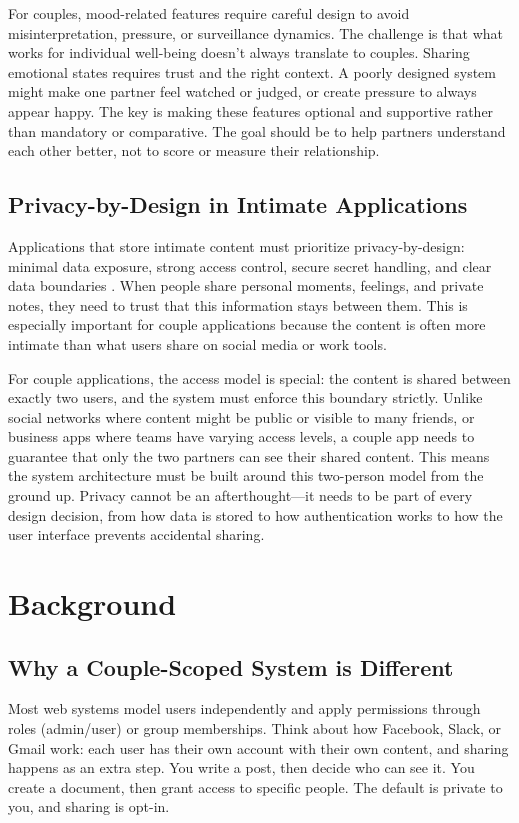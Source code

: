 \documentclass[sigconf, authorversion, nonacm, margin=0.75in]{acmart}
\begin{document}
For couples, mood-related features require careful design to avoid misinterpretation, pressure, or surveillance dynamics. The challenge is that what works for individual well-being doesn't always translate to couples. Sharing emotional states requires trust and the right context. A poorly designed system might make one partner feel watched or judged, or create pressure to always appear happy. The key is making these features optional and supportive rather than mandatory or comparative. The goal should be to help partners understand each other better, not to score or measure their relationship.

\subsection{Privacy-by-Design in Intimate Applications}
Applications that store intimate content must prioritize privacy-by-design: minimal data exposure, strong access control, secure secret handling, and clear data boundaries \cite{privacy_by_design}. When people share personal moments, feelings, and private notes, they need to trust that this information stays between them. This is especially important for couple applications because the content is often more intimate than what users share on social media or work tools.

For couple applications, the access model is special: the content is shared between exactly two users, and the system must enforce this boundary strictly. Unlike social networks where content might be public or visible to many friends, or business apps where teams have varying access levels, a couple app needs to guarantee that only the two partners can see their shared content. This means the system architecture must be built around this two-person model from the ground up. Privacy cannot be an afterthought—it needs to be part of every design decision, from how data is stored to how authentication works to how the user interface prevents accidental sharing.

\section{Background}

\subsection{Why a Couple-Scoped System is Different}
Most web systems model users independently and apply permissions through roles (admin/user) or group memberships. Think about how Facebook, Slack, or Gmail work: each user has their own account with their own content, and sharing happens as an extra step. You write a post, then decide who can see it. You create a document, then grant access to specific people. The default is private to you, and sharing is opt-in.
\end{document}
